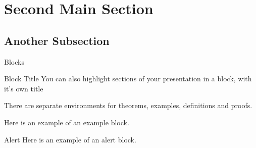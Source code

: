 \documentclass{beamer}
\begin{document}
\section{Second Main Section}

\subsection{Another Subsection}

\begin{frame}{Blocks}
\begin{block}{Block Title}
You can also highlight sections of your presentation in a block, with it's own title
\end{block}
\begin{theorem}
There are separate environments for theorems, examples, definitions and proofs.
\end{theorem}
\begin{example}
Here is an example of an example block.
\end{example}
\begin{alertblock}{Alert}
Here is an example of an alert block.
\end{alertblock}
\end{frame}
\end{document}
